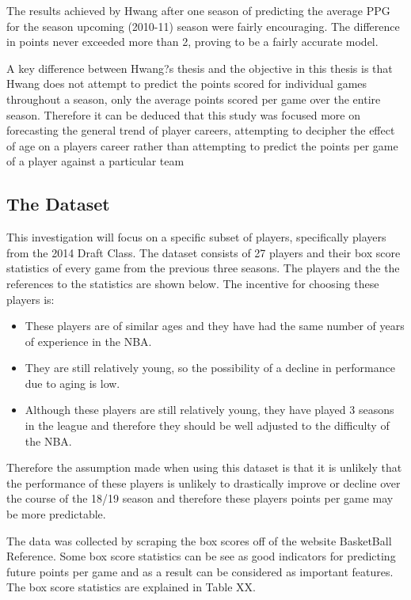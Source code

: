 \documentclass[a4paper,11pt,twoside]{article}
\begin{document}
The results achieved by Hwang after one season of predicting the average PPG for the season upcoming (2010-11) season were fairly encouraging. The difference in points never exceeded more than 2, proving to be a fairly accurate model.

A key difference between Hwang?s thesis and the objective in this thesis is that Hwang does not attempt to predict the points scored for individual games throughout a season, only the average points scored per game over the entire season. Therefore it can be deduced that this study was focused more on forecasting the general trend of player careers, attempting to decipher the effect of age on a players career rather than attempting to predict the points per game of a player against a particular team

\subsection{The Dataset}

This investigation will focus on a specific subset of players, specifically players from the 2014 Draft Class. The dataset consists of 27 players and their box score statistics of every game from the previous three seasons. The players and the the references to the statistics are shown below. The incentive for choosing these players is:
\begin{itemize}
    \item These players are of similar ages and they have had the same number of years of experience in the NBA.
    \item They are still relatively young, so the possibility of a decline in performance due to aging is low.
    \item Although these players are still relatively young, they have played 3 seasons in the league and therefore they should be well adjusted to the difficulty of the NBA.
\end{itemize}
Therefore the assumption made when using this dataset is that it is unlikely that the performance of these players is unlikely to drastically improve or decline over the course of the 18/19 season and therefore these players points per game may be more predictable.

The data was collected by scraping the box scores off of the website BasketBall Reference. Some box score statistics can be see as good indicators for predicting future points per game and as a result can be considered as important features. The box score statistics are explained in Table XX.
\end{document}
